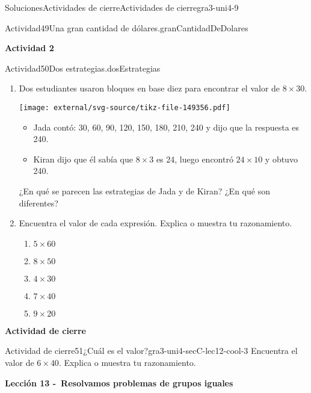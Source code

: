 \documentclass[twoside,10pt,]{article}
\begin{document}
\begin{solutions-section}{Soluciones}{Actividades de cierre}{}{Actividades de cierre}{}{}{gra3-uni4-9}
\begin{activitysolution}{Actividad}{49}{Una gran cantidad de dólares.}{granCantidadDeDolares}
\begin{enumerate}
\begin{center}
{}%
\end{center}%
\end{enumerate}
\end{activitysolution}%
\par\medskip
\noindent\textbf{\large{}\space\textperiodcentered\space{}Actividad 2}
\begin{activitysolution}{Actividad}{50}{Dos estrategias.}{dosEstrategias}%
%
\begin{enumerate}
\item{}Dos estudiantes usaron bloques en base diez para encontrar el valor de \(8\times 30\).%
\begin{image}{0}{1}{0}{}%
\texttt{[image: external/svg-source/tikz-file-149356.pdf]}
\end{image}%
%
\begin{itemize}[label=\textbullet]
\item{}Jada contó: 30, 60, 90, 120, 150, 180, 210, 240 y dijo que la respuesta es 240.%
\item{}Kiran dijo que él sabía que \(8\times 3\) es 24, luego encontró \(24\times 10\) y obtuvo 240.%
\end{itemize}
¿En qué se parecen las estrategias de Jada y de Kiran? ¿En qué son diferentes?%
\item{}Encuentra el valor de cada expresión. Explica o muestra tu razonamiento.%
%
\begin{enumerate}
\item{}\(\displaystyle 5 \times 60\)%
\item{}\(\displaystyle 8 \times 50\)%
\item{}\(\displaystyle 4 \times 30\)%
\item{}\(\displaystyle 7 \times 40\)%
\item{}\(\displaystyle 9 \times 20\)%
\end{enumerate}
\end{enumerate}
\end{activitysolution}%
\par\medskip
\noindent\textbf{\large{}\space\textperiodcentered\space{}Actividad de cierre}
\begin{projectsolution}{Actividad de cierre}{51}{¿Cuál es el valor?}{gra3-uni4-secC-lec12-cool-3}%
Encuentra el valor de \(6\times 40\). Explica o muestra tu razonamiento.%
\end{projectsolution}%
\par\medskip
\noindent\textbf{\large{}\space\textperiodcentered\space{}Lección 13 -~Resolvamos problemas de grupos iguales\\
}
\end{solutions-section}
\end{document}
